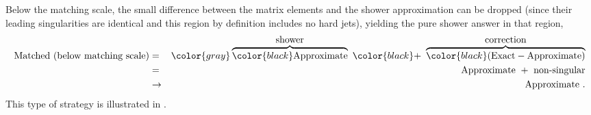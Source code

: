 Below the matching scale, the
small difference between the matrix elements and the shower
approximation can be dropped (since their leading singularities are
identical and this region by definition includes no hard jets), 
yielding the pure shower answer in that region,
\begin{eqnarray}
\mbox{Matched (below matching scale)} & = &
\color{gray}\overbrace{\color{black}\mbox{Approximate}}^{\mbox{shower}}
\ {\color{black}+} \ \overbrace{\color{black}(\mbox{Exact} -
\mbox{Approximate})}^{\mbox{correction}}\nonumber\\ 
& = & \mbox{Approximate} \ + \ \mbox{non-singular} \nonumber \\
& \to & \mbox{Approximate}~.
\end{eqnarray}
This type of strategy is illustrated in .
\begin{figure}
\begin{center}%
\end{center}
\end{figure}
